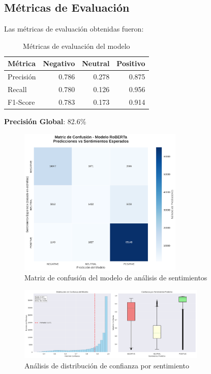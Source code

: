 \documentclass[12pt,a4paper,twoside,openany]{book}
\begin{document}
\subsection{Métricas de Evaluación}

Las métricas de evaluación obtenidas fueron:

\begin{table}[H]
\centering
\caption{Métricas de evaluación del modelo}
\begin{tabular}{@{}lrrr@{}}
\toprule
\textbf{Métrica} & \textbf{Negativo} & \textbf{Neutral} & \textbf{Positivo} \\
\midrule
Precisión & 0.786 & 0.278 & 0.875 \\
Recall & 0.780 & 0.126 & 0.956 \\
F1-Score & 0.783 & 0.173 & 0.914 \\
\bottomrule
\end{tabular}
\end{table}

\textbf{Precisión Global}: 82.6\%

\begin{figure}[H]
\centering
\includegraphics[width=0.7\textwidth]{figures/sentiment_confusion_matrix.png}
\caption{Matriz de confusión del modelo de análisis de sentimientos}
\label{fig:sentiment_confusion_matrix}
\end{figure}

\begin{figure}[H]
\centering
\includegraphics[width=0.8\textwidth]{figures/sentiment_confidence_analysis.png}
\caption{Análisis de distribución de confianza por sentimiento}
\label{fig:sentiment_confidence_analysis}
\end{figure}
\end{document}
